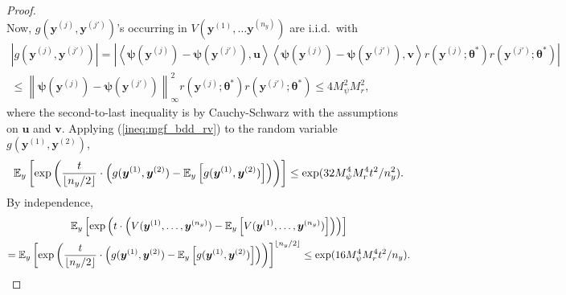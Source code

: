 \documentclass[11pt]{article}
\numberwithin{equation}{section}
\numberwithin{theorem}{section}
\def\fatu{\boldsymbol{u}}
\def\fatv{\boldsymbol{v}}
\def\faty{\boldsymbol{y}}
\def\fattheta{\boldsymbol{\theta}}
\def\fatpsi{\boldsymbol{\psi}}
\theoremstyle{definition}
\theoremstyle{remark}
\begin{document}
\begin{proof}
\begin{equation}
\end{equation}
Now, $g(\faty^{(j)},\faty^{(j')})$'s occurring in $V(\faty^{(1)},\dots\faty^{(n_y)})$ are i.i.d.~with
\begin{multline}
|g(\faty^{(j)},\faty^{(j')})|
= \left| \left\langle \fatpsi(\faty^{(j)}) - \fatpsi(\faty^{(j')}),\fatu \right\rangle \left\langle \fatpsi(\faty^{(j)}) - \fatpsi(\faty^{(j')}),\fatv \right\rangle r(\faty^{(j)};\fattheta^*) r(\faty^{(j')};\fattheta^*) \right| \\
\leq \left\| \fatpsi(\faty^{(j)}) - \fatpsi(\faty^{(j')}) \right\|_\infty^2 r(\faty^{(j)};\fattheta^*) r(\faty^{(j')};\fattheta^*)
\leq 4 M_\psi^2 M_r^2,
\end{multline}
where the second-to-last inequality is by Cauchy-Schwarz with the assumptions on $\fatu$ and $\fatv$.
Applying (\ref{ineq:mgf_bdd_rv}) to the random variable $g(\faty^{(1)},\faty^{(2)})$,
\begin{equation}
\EE_y \left[ \exp\left( \frac{t}{\lfloor n_y/2 \rfloor}\cdot\left(g(\faty^{(1)},\faty^{(2)}) - \EE_y \left[ g(\faty^{(1)},\faty^{(2)}) \right] \right) \right) \right]
\leq \exp(32 M_\psi^4 M_r^4 t^2 / n_y^2).
\end{equation}
By independence,
\begin{multline}
\EE_y \left[ \exp\left( t \cdot \left( V(\faty^{(1)},\dots,\faty^{(n_y)}) - \EE_y \left[ V(\faty^{(1)},\dots,\faty^{(n_y)}) \right] \right) \right) \right] \\
= \EE_y \left[ \exp\left( \frac{t}{\lfloor n_y/2 \rfloor} \cdot \left( g(\faty^{(1)},\faty^{(2)}) - \EE_y \left[ g(\faty^{(1)},\faty^{(2)}) \right] \right) \right) \right]^{\lfloor n_y/2 \rfloor}
\leq \exp(16 M_\psi^4 M_r^4 t^2 / n_y).
\end{multline}
\end{proof}
\end{document}
